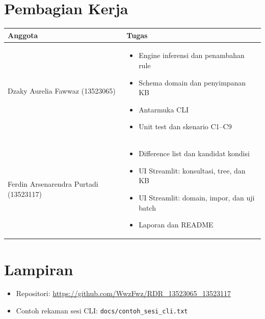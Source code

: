 \documentclass[11pt,a4paper]{article}
\begin{document}
\section{Pembagian Kerja}
\begin{table}[H]
\centering
\begin{tabular}{ll}
\toprule
\textbf{Anggota} & \textbf{Tugas} \\
\midrule
Dzaky Aurelia Fawwaz (13523065) &
  \begin{minipage}[t]{0.6\textwidth}\begin{itemize}[nosep,leftmargin=*]
    \item Engine inferensi dan penambahan rule
    \item Schema domain dan penyimpanan KB
    \item Antarmuka CLI
    \item Unit test dan skenario C1--C9
  \end{itemize}\end{minipage} \\[1em]
Ferdin Arsenarendra Purtadi (13523117) &
  \begin{minipage}[t]{0.6\textwidth}\begin{itemize}[nosep,leftmargin=*]
    \item Difference list dan kandidat kondisi
    \item UI Streamlit: konsultasi, tree, dan KB
    \item UI Streamlit: domain, impor, dan uji batch
    \item Laporan dan README
  \end{itemize}\end{minipage} \\
\bottomrule
\end{tabular}
\end{table}

\section*{Lampiran}
\begin{itemize}[nosep]
  \item Repositori: \url{https://github.com/WwzFwz/RDR_13523065_13523117}
  \item Contoh rekaman sesi CLI: \texttt{docs/contoh\_sesi\_cli.txt}
\end{itemize}
\end{document}
